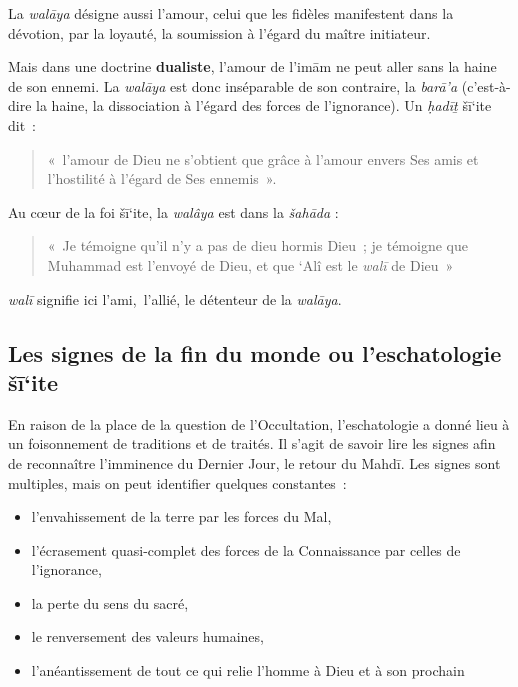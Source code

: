 La \emph{walāya} désigne aussi l'amour, celui que les fidèles
manifestent dans la dévotion, par la loyauté, la soumission à l'égard du
maître initiateur.

Mais dans une doctrine \textbf{dualiste}, l'amour de l'imām ne peut aller sans la
haine de son ennemi. La \emph{walāya} est donc inséparable de son
contraire, la \emph{barā'a} (c'est-à-dire la haine, la dissociation à
l'égard des forces de l'ignorance). Un \emph{ḥadīṯ} šī`ite dit~:

\begin{quote}
«~l'amour de Dieu ne s'obtient que grâce à l'amour envers Ses amis et
l'hostilité à l'égard de Ses ennemis~».    
\end{quote}


Au cœur de la foi šī`ite, la \emph{walâya} est dans la \emph{šahāda} :
\begin{quote}
   «~Je témoigne qu'il n'y a pas de dieu hormis Dieu~; je témoigne que
Muhammad est l'envoyé de Dieu, et que `Alî est le \emph{walī} de
Dieu~» 
\end{quote}
 \emph{walī} signifie ici l'ami,~l'allié, le détenteur de la
\emph{walāya}.






\subsection{{Les signes de la fin du monde ou
l'eschatologie šī`ite
}\label{les-signes-de-la-fin-du-monde-ou-leschatologie-ux161ux12bite}}

En raison de la place de la question de l'Occultation, l'eschatologie a
donné lieu à un foisonnement de traditions et de traités. Il s'agit de
savoir lire les signes afin de reconnaître l'imminence du Dernier Jour,
le retour du Mahdī. Les signes sont multiples, mais on peut identifier
quelques constantes~:

\begin{itemize}
\item
  l'envahissement de la terre par les forces du Mal,
\item
  l'écrasement quasi-complet des forces de la Connaissance par celles de
  l'ignorance,
\item
  la perte du sens du sacré,
\item
  le renversement des valeurs humaines,
\item
  l'anéantissement de tout ce qui relie l'homme à Dieu et à son prochain
\end{itemize}


